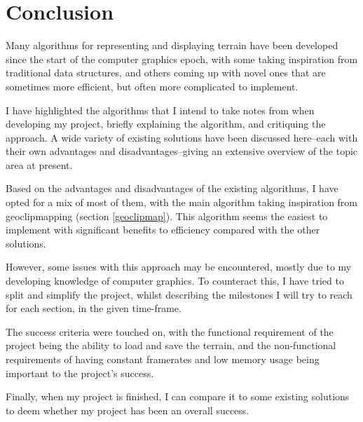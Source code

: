 \documentclass[notitlepage,12pt]{article}
\begin{document}
\section{Conclusion}

Many algorithms for representing and displaying terrain have been developed since the start of the computer graphics epoch, with some taking inspiration from traditional data structures, and others coming up with novel ones that are sometimes more efficient, but often more complicated to implement.

I have highlighted the algorithms that I intend to take notes from when developing my project, briefly explaining the algorithm, and critiquing the approach. A wide variety of existing solutions have been discussed here--each with their own advantages and disadvantages--giving an extensive overview of the topic area at present. 

Based on the advantages and disadvantages of the existing algorithms, I have opted for a mix of most of them, with the main algorithm taking inspiration from geoclipmapping (section \ref{geoclipmap}). This algorithm seems the easiest to implement with significant benefits to efficiency compared with the other solutions.

However, some issues with this approach may be encountered, mostly due to my developing knowledge of computer graphics. To counteract this, I have tried to split and simplify the project, whilst describing the milestones I will try to reach for each section, in the given time-frame.

The success criteria were touched on, with the functional requirement of the project being the ability to load and save the terrain, and the non-functional requirements of having constant framerates and low memory usage being important to the project's success.

Finally, when my project is finished, I can compare it to some existing solutions to deem whether my project has been an overall success.

\clearpage


\end{document}
